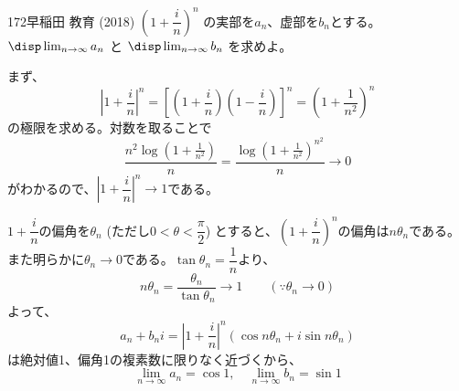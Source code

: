 \begin{prob}{172}{}{早稲田 教育 (2018)}
 $\left(1+\dfrac{i}{n}\right)^n$ の実部を$a_n$、虚部を$b_n$とする。$\disp \lim_{n\to\infty} a_n$ と $\disp \lim_{n\to\infty} b_n$ を求めよ。
\end{prob}
まず、
\[ \left|1+\frac{i}{n}\right|^n=\left[\left(1+\frac{i}{n}\right)\left(1-\frac{i}{n}\right)\right]^n=\left(1+\frac{1}{n^2}\right)^n \]
の極限を求める。対数を取ることで
\[ \frac{n^2\log\left(1+\frac{1}{n^2}\right)}{n}=\frac{\log\left(1+\frac{1}{n^2}\right)^{n^2}}{n} \to 0 \]
がわかるので、$\left|1+\dfrac{i}{n}\right|^n \to 1$である。

$1+\dfrac{i}{n}$の偏角を$\theta_n$ (ただし$0<\theta<\dfrac{\pi}{2}$) とすると、$\left(1+\dfrac{i}{n}\right)^n$の偏角は$n\theta_n$である。また明らかに$\theta_n \to 0$である。$\tan\theta_n=\dfrac{1}{n}$より、
\[ n\theta_n=\frac{\theta_n}{\tan\theta_n} \to 1 \qquad (\because \theta_n\to 0) \]
よって、
\[ a_n+b_ni=\left|1+\frac{i}{n}\right|^n(\cos n\theta_n+i\sin n\theta_n) \]
は絶対値1、偏角1の複素数に限りなく近づくから、
\[ \lim_{n\to\infty} a_n=\cos 1,\quad \lim_{n\to\infty} b_n=\sin 1 \]